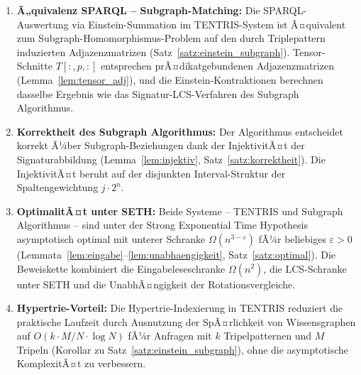 ﻿\documentclass[a4paper,12pt]{article}
\theoremstyle{definition}
\begin{document}
\begin{enumerate}
  \item \textbf{Ã„quivalenz SPARQL -- Subgraph-Matching:} Die SPARQL-Auswertung via
        Einstein-Summation im TENTRIS-System ist Ã¤quivalent zum
        Subgraph-Homomorphismus-Problem auf den durch Triplepattern induzierten
        Adjazenzmatrizen (Satz~\ref{satz:einstein_subgraph}). Tensor-Schnitte
        $T[:,p,:]$ entsprechen prÃ¤dikatgebundenen Adjazenzmatrizen
        (Lemma~\ref{lem:tensor_adj}), und die Einstein-Kontraktionen berechnen
        dasselbe Ergebnis wie das Signatur-LCS-Verfahren des Subgraph Algorithmus.

  \item \textbf{Korrektheit des Subgraph Algorithmus:} Der Algorithmus entscheidet
        korrekt Ã¼ber Subgraph-Beziehungen dank der InjektivitÃ¤t der Signaturabbildung
        (Lemma~\ref{lem:injektiv}, Satz~\ref{satz:korrektheit}). Die InjektivitÃ¤t beruht
        auf der disjunkten Interval-Struktur der Spaltengewichtung $j \cdot 2^n$.

  \item \textbf{OptimalitÃ¤t unter SETH:} Beide Systeme -- TENTRIS und Subgraph
        Algorithmus -- sind unter der Strong Exponential Time Hypothesis asymptotisch
        optimal mit unterer Schranke $\Omega(n^{3-\varepsilon})$ fÃ¼r beliebiges
        $\varepsilon > 0$ (Lemmata~\ref{lem:eingabe}--\ref{lem:unabhaengigkeit},
        Satz~\ref{satz:optimal}). Die Beweiskette kombiniert die
        Eingabeleseschranke $\Omega(n^2)$, die LCS-Schranke unter SETH und die
        UnabhÃ¤ngigkeit der Rotationsvergleiche.

  \item \textbf{Hypertrie-Vorteil:} Die Hypertrie-Indexierung in TENTRIS reduziert
        die praktische Laufzeit durch Ausnutzung der SpÃ¤rlichkeit von Wissensgraphen
        auf $O(k \cdot M/N \cdot \log N)$ fÃ¼r Anfragen mit $k$ Tripelpatternen und
        $M$ Tripeln (Korollar zu Satz~\ref{satz:einstein_subgraph}), ohne die
        asymptotische KomplexitÃ¤t zu verbessern.


\end{enumerate}
\end{document}
